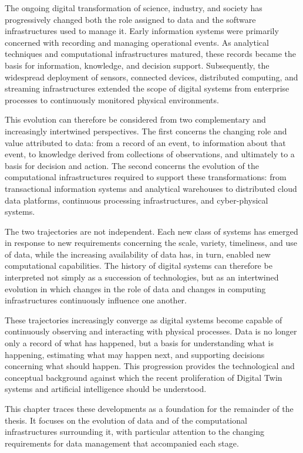 The ongoing digital transformation of science, industry, and society has progressively changed both the role assigned to data and the software infrastructures used to manage it. Early information systems were primarily concerned with recording and managing operational events. As analytical techniques and computational infrastructures matured, these records became the basis for information, knowledge, and decision support. Subsequently, the widespread deployment of sensors, connected devices, distributed computing, and streaming infrastructures extended the scope of digital systems from enterprise processes to continuously monitored physical environments.

This evolution can therefore be considered from two complementary and increasingly intertwined perspectives. The first concerns the changing role and value attributed to data: from a record of an event, to information about that event, to knowledge derived from collections of observations, and ultimately to a basis for decision and action. The second concerns the evolution of the computational infrastructures required to support these transformations: from transactional information systems and analytical warehouses to distributed cloud data platforms, continuous processing infrastructures, and cyber-physical systems.

The two trajectories are not independent. Each new class of systems has emerged in response to new requirements concerning the scale, variety, timeliness, and use of data, while the increasing availability of data has, in turn, enabled new computational capabilities. The history of digital systems can therefore be interpreted not simply as a succession of technologies, but as an intertwined evolution in which changes in the role of data and changes in computing infrastructures continuously influence one another.

These trajectories increasingly converge as digital systems become capable of continuously observing and interacting with physical processes. Data is no longer only a record of what has happened, but a basis for understanding what is happening, estimating what may happen next, and supporting decisions concerning what should happen. This progression provides the technological and conceptual background against which the recent proliferation of Digital Twin systems and artificial intelligence should be understood.

This chapter traces these developments as a foundation for the remainder of the thesis. It focuses on the evolution of data and of the computational infrastructures surrounding it, with particular attention to the changing requirements for data management that accompanied each stage.

